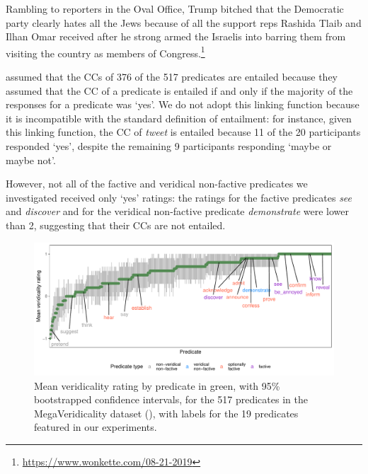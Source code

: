 \documentclass[11pt,fleqn]{article}
\newcommand{\6}{\mbox{$[\hspace*{-.6mm}[$}}
\newcommand{\9}{\mbox{$]\hspace*{-.6mm}]$}}
\begin{document}
{{\begin{exe}
 Rambling to reporters in the Oval Office, Trump bitched that the Democratic party clearly hates all the Jews because of all the support reps Rashida Tlaib and Ilhan Omar received after he strong armed the Israelis into barring them from visiting the country as members of Congress.\footnote{\url{https://www.wonkette.com/08-21-2019}}
\end{exe}

\citealt{white-rawlins-nels2018} assumed that the CCs of 376 of the 517 predicates are entailed because they assumed that the CC of a predicate is entailed if and only if the majority of the responses for a predicate was `yes'. We do not adopt this linking function because it is incompatible with the standard definition of entailment: for instance, given this linking function, the CC of {\em tweet} is entailed because 11 of the 20 participants responded `yes', despite the remaining 9 participants responding `maybe or maybe not'.} However, not all of the factive and veridical non-factive predicates we investigated received only `yes' ratings: the ratings for the factive predicates {\em see} and {\em discover} and for the veridical non-factive predicate {\em demonstrate} were lower than 2, suggesting that their CCs are not entailed.

\begin{figure}[H]
\centering
\includegraphics[width=.75\paperwidth]{../../MegaVeridicality-analysis/graphs/means-entailment-by-predicate}

\caption{Mean veridicality rating by predicate in green, with 95\% bootstrapped confidence intervals, for the 517 predicates in the MegaVeridicality dataset (\citealt{white-rawlins-nels2018,white-etal2018b}), with labels for the 19 predicates featured in our experiments.}
\label{f-white-rawlins-ent}
\end{figure}

}
\end{document}

